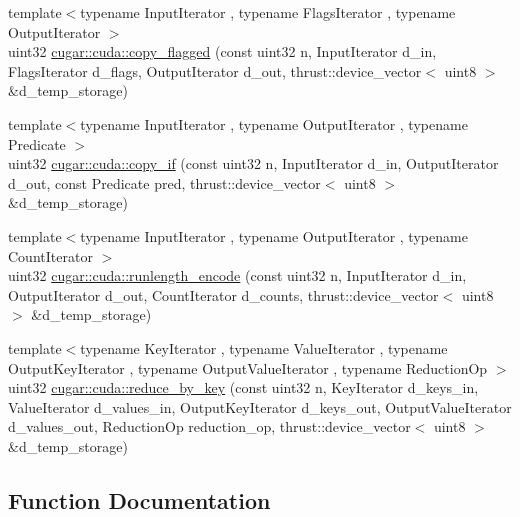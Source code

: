 \begin{DoxyCompactItemize}
\item 
{\footnotesize template$<$typename Input\+Iterator , typename Flags\+Iterator , typename Output\+Iterator $>$ }\\uint32 \hyperlink{group___c_u_d_a_primitives_ga0b0dec5ea7ad38e94c5faf1816d7d5af}{cugar\+::cuda\+::copy\+\_\+flagged} (const uint32 n, Input\+Iterator d\+\_\+in, Flags\+Iterator d\+\_\+flags, Output\+Iterator d\+\_\+out, thrust\+::device\+\_\+vector$<$ uint8 $>$ \&d\+\_\+temp\+\_\+storage)
\item 
{\footnotesize template$<$typename Input\+Iterator , typename Output\+Iterator , typename Predicate $>$ }\\uint32 \hyperlink{group___c_u_d_a_primitives_gab1d60d84e7f1b146badd6d52a4469979}{cugar\+::cuda\+::copy\+\_\+if} (const uint32 n, Input\+Iterator d\+\_\+in, Output\+Iterator d\+\_\+out, const Predicate pred, thrust\+::device\+\_\+vector$<$ uint8 $>$ \&d\+\_\+temp\+\_\+storage)
\item 
{\footnotesize template$<$typename Input\+Iterator , typename Output\+Iterator , typename Count\+Iterator $>$ }\\uint32 \hyperlink{group___c_u_d_a_primitives_ga889bd14de96d31357a64de317c983515}{cugar\+::cuda\+::runlength\+\_\+encode} (const uint32 n, Input\+Iterator d\+\_\+in, Output\+Iterator d\+\_\+out, Count\+Iterator d\+\_\+counts, thrust\+::device\+\_\+vector$<$ uint8 $>$ \&d\+\_\+temp\+\_\+storage)
\item 
{\footnotesize template$<$typename Key\+Iterator , typename Value\+Iterator , typename Output\+Key\+Iterator , typename Output\+Value\+Iterator , typename Reduction\+Op $>$ }\\uint32 \hyperlink{group___c_u_d_a_primitives_gaaa4e34f4ec9515879a152f155e561bca}{cugar\+::cuda\+::reduce\+\_\+by\+\_\+key} (const uint32 n, Key\+Iterator d\+\_\+keys\+\_\+in, Value\+Iterator d\+\_\+values\+\_\+in, Output\+Key\+Iterator d\+\_\+keys\+\_\+out, Output\+Value\+Iterator d\+\_\+values\+\_\+out, Reduction\+Op reduction\+\_\+op, thrust\+::device\+\_\+vector$<$ uint8 $>$ \&d\+\_\+temp\+\_\+storage)
\end{DoxyCompactItemize}


\subsection{Function Documentation}
\mbox{\label{group___c_u_d_a_primitives_gaaf45a87aabac21eef7be5612e16966bd}} 
